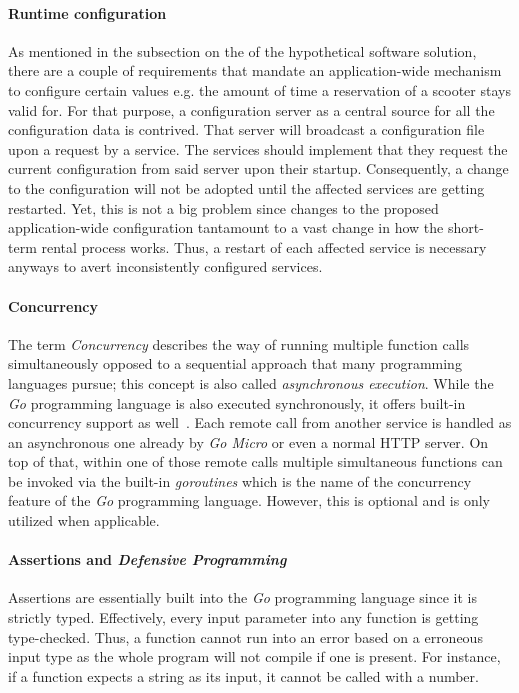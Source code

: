 \documentclass[12pt,a4paper]{report}
\begin{document}
\paragraph{Runtime configuration}
As mentioned in the subsection on the \textit{}
of the hypothetical software solution, there are a couple of requirements that
mandate an application-wide mechanism to configure certain values e.g.
the amount of time a reservation of a scooter stays valid for.
For that purpose, a configuration server as a central source for all the
configuration data is contrived. That server will broadcast a configuration file
upon a request by a service. The services should implement that they request
the current configuration from said server upon their startup. Consequently,
a change to the configuration will not be adopted until the affected services
are getting restarted. Yet, this is not a big problem since changes to the proposed
application-wide configuration tantamount to a vast change in how the
short-term rental process works. Thus, a restart of each affected service is
necessary anyways to avert inconsistently configured services.

\paragraph{Concurrency}
The term \textit{Concurrency} describes the way of running multiple function
calls simultaneously opposed to a sequential approach that many programming languages
pursue; this concept is also called \textit{asynchronous execution}.
While the \textit{Go} programming language is also executed synchronously,
it offers built-in concurrency support as well~\cite{golang-concurrency}.
Each remote call from another service is handled as an asynchronous one already
by \textit{Go Micro} or even a normal HTTP server. On top of that, within one
of those remote calls multiple simultaneous functions can be invoked via
the built-in \textit{goroutines} which is the name of the concurrency feature
of the \textit{Go} programming language. However, this is optional and is only
utilized when applicable.

\paragraph{Assertions and \textit{Defensive Programming}}
Assertions are essentially built into the \textit{Go} programming language
since it is strictly typed. Effectively, every input parameter into any
function is getting type-checked. Thus, a function cannot run into an error
based on a erroneous input type as the whole program will not compile
if one is present. For instance, if a function expects a string as its input,
it cannot be called with a number.
\end{document}
